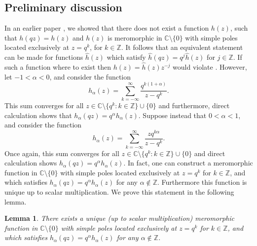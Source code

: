 \documentclass[a4paper,reqno]{amsart}
\numberwithin{equation}{section}
\newtheorem{lemma}[theorem]{Lemma}
\numberwithin{figure}{section}
\begin{document}
\subsection{Preliminary discussion}\label{Prelim sect}
In an earlier paper \cite[Lemma A.1]{jt2023}, we showed that there does not exist a function $h(z)$, such that $h(qz)=h(z)$ and $h(z)$ is meromorphic in $\mathbb{C}\setminus \{0\}$ with simple poles located exclusively at $z=q^k$, for $k\in\mathbb{Z}$. It follows that an equivalent statement can be made for functions $\hat{h}(z)$ which satisfy $\hat{h}(qz)=q^{j}\hat{h}(z)$ for $j\in\mathbb{Z}$. If such a function where to exist then $h(z) = \hat{h}(z)z^{-j}$ would violate \cite[Lemma A.1]{jt2023}. However, let $-1<\alpha<0$, and consider the function
\begin{equation}
    h_\alpha (z) = \sum_{k=-\infty}^\infty \frac{q^{k(1+\alpha)}}{z-q^k}.
\end{equation}
This sum converges for all $z \in \mathbb{C} \setminus \{q^{k}: k \in \mathbb{Z} \}\cup \{0\}$ and furthermore, direct calculation shows that $h_\alpha(qz) = q^\alpha h_\alpha(z)$. Suppose instead that $0<\alpha<1$, and consider the function
\begin{equation}
    h_\alpha (z) = \sum_{k=-\infty}^\infty \frac{zq^{k\alpha}}{z-q^k}.
\end{equation}
Once again, this sum converges for all $z \in \mathbb{C} \setminus \{q^{k}: k \in \mathbb{Z} \}\cup \{0\}$ and direct calculation shows $h_\alpha(qz) = q^\alpha h_\alpha(z)$. In fact, one can construct a meromorphic function in $\mathbb{C}\setminus \{0\}$ with simple poles located exclusively at $z=q^k$ for $k\in\mathbb{Z}$, and which satisfies $h_\alpha(qz) = q^\alpha h_\alpha(z)$ for any $\alpha \notin \mathbb{Z}$. Furthermore this function is unique up to scalar multiplication. We prove this statement in the following lemma.
\begin{lemma}\label{h lemma}
    There exists a unique (up to scalar multiplication) meromorphic function in $\mathbb{C}\setminus \{0\}$ with simple poles located exclusively at $z=q^k$ for $k\in\mathbb{Z}$, and which satisfies $h_\alpha(qz) = q^\alpha h_\alpha(z)$ for any $\alpha \notin \mathbb{Z}$.
\end{lemma}
\end{document}
